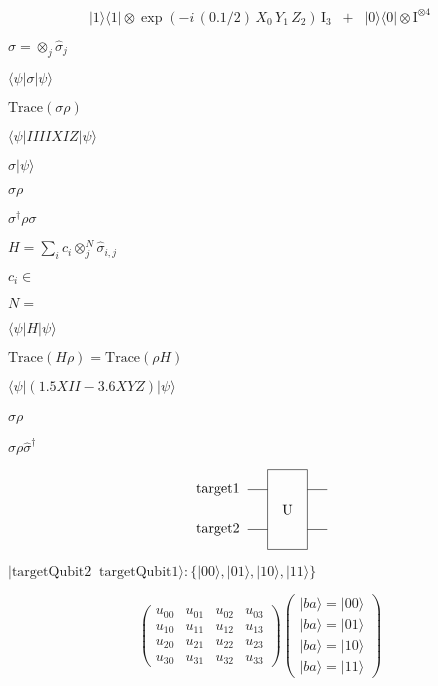 \documentclass{article}
\begin{document}
\[
   |1\rangle\langle 1 | \otimes \exp\left( -i \, (0.1/2) \, X_0 \, Y_1 \, Z_2 \right) \, \text{I}_3
   \;\; + \;\; |0\rangle\langle 0| \otimes \text{I}^{\otimes 4}
\]
\pagebreak

$ \sigma = \otimes_j \hat{\sigma}_j $
\pagebreak

$ \langle \psi | \sigma | \psi \rangle $
\pagebreak

$ \text{Trace}(\sigma \rho) $
\pagebreak

$ \langle \psi | I I I I X I Z | \psi \rangle $
\pagebreak

$ \sigma | \psi \rangle $
\pagebreak

$ \sigma \rho $
\pagebreak

$ \sigma^\dagger \rho \sigma $
\pagebreak

$ H = \sum_i c_i \otimes_j^{N} \hat{\sigma}_{i,j} $
\pagebreak

$ c_i \in $
\pagebreak

$ N = $
\pagebreak

$ \langle \psi | H | \psi \rangle $
\pagebreak

$ \text{Trace}(H \rho) =\text{Trace}(\rho H) $
\pagebreak

$ \langle \psi | (1.5 X I I - 3.6 X Y Z) | \psi \rangle $
\pagebreak

$ \hat{\sigma} \rho $
\pagebreak

$ \hat{\sigma} \rho \hat{\sigma}^\dagger $
\pagebreak

\[
             \begin{tikzpicture}[scale=.5]
             \node[draw=none] at (-3.5, 0) {target2};
             \node[draw=none] at (-3.5, 2) {target1};

             \draw (-2,0) -- (-1, 0);
             \draw (1, 0) -- (2, 0);
             \draw (-2,2) -- (-1, 2);
             \draw (1, 2) -- (2, 2);
             \draw (-1,-1)--(-1,3)--(1,3)--(1,-1)--cycle;
             \node[draw=none] at (0, 1) {U};
             \end{tikzpicture}
 \]
\pagebreak

$ |\text{targetQubit2} \;\; \text{targetQubit1}\rangle : \{ |00\rangle, |01\rangle, |10\rangle, |11\rangle \} $
\pagebreak

\[
\begin{pmatrix}
u_{00} & u_{01} & u_{02} & u_{03} \\
u_{10} & u_{11} & u_{12} & u_{13} \\
u_{20} & u_{21} & u_{22} & u_{23} \\
u_{30} & u_{31} & u_{32} & u_{33}
\end{pmatrix}
\begin{pmatrix}
|ba\rangle = |00\rangle \\
|ba\rangle = |01\rangle \\
|ba\rangle = |10\rangle \\
|ba\rangle = |11\rangle 
\end{pmatrix}
\]
\pagebreak
\end{document}
